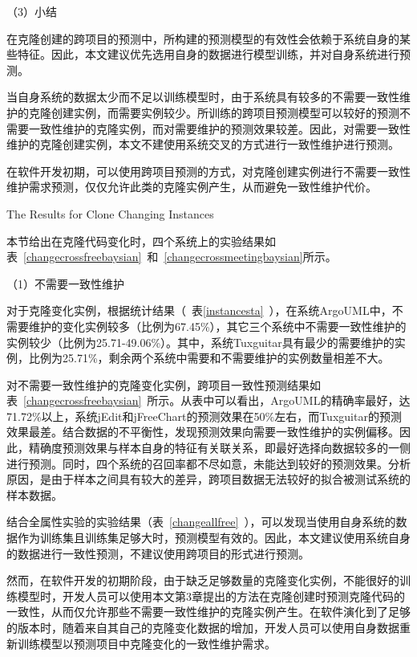 （3）小结

在克隆创建的跨项目的预测中，所构建的预测模型的有效性会依赖于系统自身的某些特征。因此，本文建议优先选用自身的数据进行模型训练，并对自身系统进行预测。

当自身系统的数据太少而不足以训练模型时，由于系统具有较多的不需要一致性维护的克隆创建实例，而需要实例较少。所训练的跨项目预测模型可以较好的预测不需要一致性维护的克隆实例，而对需要维护的预测效果较差。因此，对需要一致性维护的克隆创建实例，本文不建使用系统交叉的方式进行一致性维护进行预测。

在软件开发初期，可以使用跨项目预测的方式，对克隆创建实例进行不需要一致性维护需求预测，仅仅允许此类的克隆实例产生，从而避免一致性维护代价。

{The Results for Clone Changing Instances}

本节给出在克隆代码变化时，四个系统上的实验结果如表~\ref{changecrossfreebaysian}~和~\ref{changecrossmeetingbaysian}所示。

（1）不需要一致性维护

对于克隆变化实例，根据统计结果（~表\ref{instancesta}~），在系统ArgoUML中，不需要维护的变化实例较多（比例为67.45\%），其它三个系统中不需要一致性维护的实例较少（比例为25.71-49.06\%）。其中，系统Tuxguitar具有最少的需要维护的实例，比例为25.71\%，剩余两个系统中需要和不需要维护的实例数量相差不大。

对不需要一致性维护的克隆变化实例，跨项目一致性预测结果如表~\ref{changecrossfreebaysian}~所示。从表中可以看出，ArgoUML的精确率最好，达71.72\%以上，系统jEdit和jFreeChart的预测效果在50\%左右，而Tuxguitar的预测效果最差。结合数据的不平衡性，发现预测效果向需要一致性维护的实例偏移。因此，精确度预测效果与样本自身的特征有关联关系，即最好选择向数据较多的一侧进行预测。同时，四个系统的召回率都不尽如意，未能达到较好的预测效果。分析原因，是由于样本之间具有较大的差异，跨项目数据无法较好的拟合被测试系统的样本数据。

结合全属性实验的实验结果（表~\ref{changeallfree}~），可以发现当使用自身系统的数据作为训练集且训练集足够大时，预测模型有效的。因此，本文建议使用系统自身的数据进行一致性预测，不建议使用跨项目的形式进行预测。

然而，在软件开发的初期阶段，由于缺乏足够数量的克隆变化实例，不能很好的训练模型时，开发人员可以使用本文第3章提出的方法在克隆创建时预测克隆代码的一致性，从而仅允许那些不需要一致性维护的克隆实例产生。在软件演化到了足够的版本时，随着来自其自己的克隆变化数据的增加，开发人员可以使用自身数据重新训练模型以预测项目中克隆变化的一致性维护需求。

